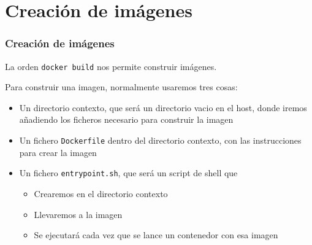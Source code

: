 \documentclass[ucs]{beamer}
\begin{document}
\section{Creación de imágenes}
\begin{frame}[fragile]
\frametitle{Creación de imágenes}

La orden  \verb|docker build| nos permite construir imágenes.

Para construir una imagen, normalmente usaremos tres cosas:

\begin{itemize}
\item
Un directorio contexto, que será un directorio vacio en el host, donde iremos añadiendo
los ficheros necesario para construir la imagen




\item
Un fichero 
\verb|Dockerfile|
dentro del directorio contexto, con las instrucciones para crear la imagen



\item
Un fichero
\verb|entrypoint.sh|, 
que será un script de shell que 

\begin{itemize}
\item
Crearemos en el directorio contexto

\item
Llevaremos a la imagen 

\item
Se ejecutará cada vez que se lance un contenedor con esa imagen
\end{itemize}


\end{itemize}

\end{frame}
\end{document}
